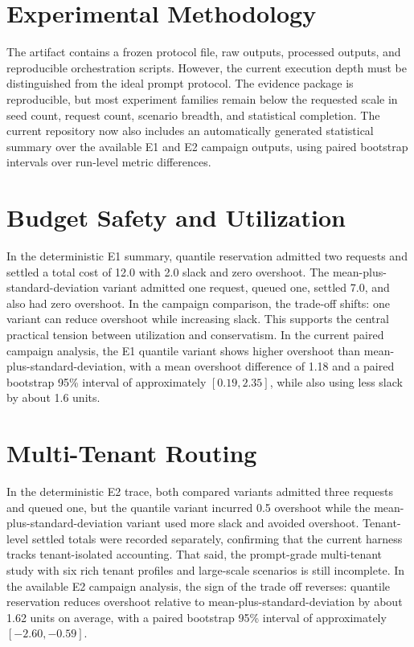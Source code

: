 \documentclass[10pt,journal,compsoc]{IEEEtran}
\begin{document}
\section{Experimental Methodology}
The artifact contains a frozen protocol file, raw outputs, processed outputs,
and reproducible orchestration scripts. However, the current execution depth
must be distinguished from the ideal prompt protocol. The evidence package is
reproducible, but most experiment families remain below the requested scale in
seed count, request count, scenario breadth, and statistical completion. The
current repository now also includes an automatically generated statistical
summary over the available E1 and E2 campaign outputs, using paired bootstrap
intervals over run-level metric differences.

\section{Budget Safety and Utilization}
In the deterministic E1 summary, quantile reservation admitted two requests and
settled a total cost of 12.0 with 2.0 slack and zero overshoot. The
mean-plus-standard-deviation variant admitted one request, queued one, settled
7.0, and also had zero overshoot. In the campaign comparison, the trade-off
shifts: one variant can reduce overshoot while increasing slack. This supports
the central practical tension between utilization and conservatism. In the
current paired campaign analysis, the E1 quantile variant shows higher
overshoot than mean-plus-standard-deviation, with a mean overshoot difference
of 1.18 and a paired bootstrap 95\% interval of approximately
$[0.19, 2.35]$, while also using less slack by about 1.6 units.

\section{Multi-Tenant Routing}
In the deterministic E2 trace, both compared variants admitted three requests
and queued one, but the quantile variant incurred 0.5 overshoot while the
mean-plus-standard-deviation variant used more slack and avoided overshoot.
Tenant-level settled totals were recorded separately, confirming that the
current harness tracks tenant-isolated accounting. That said, the prompt-grade
multi-tenant study with six rich tenant profiles and large-scale scenarios is
still incomplete. In the available E2 campaign analysis, the sign of the trade
off reverses: quantile reservation reduces overshoot relative to
mean-plus-standard-deviation by about 1.62 units on average, with a paired
bootstrap 95\% interval of approximately $[-2.60, -0.59]$.
\end{document}
